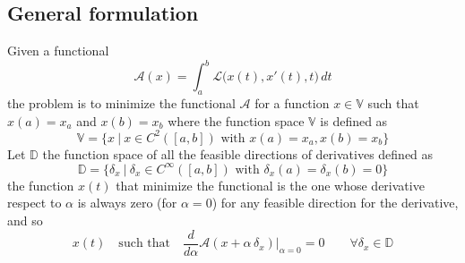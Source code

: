 \subsection{General formulation}
	Given a functional
	\begin{equation}
		\mathcal A(x) = \int_a^b \mathcal L\big(x(t),x'(t),t\big)\, dt
	\end{equation}
	the problem is to minimize the functional $\mathcal A$ for a function $x \in \mathds V$ such that $x(a) = x_a$ and $x(b) = x_b$ where the function space $\mathds V$ is defined as
	\[ \mathds V = \big\{ x \ | \ x\in C^2([a,b]) \textrm{ with } x(a) = x_a,x(b) = x_b \big\} \]
	Let $\mathds D$ the function space of all the feasible directions of derivatives defined as
	\[ \mathds D = \big\{ \delta_x \ | \ \delta_x \in C^{\infty}([a,b]) \textrm{ with } \delta_x(a) = \delta_x(b) = 0 \big\} \]
	the function $x(t)$ that minimize the functional is the one whose derivative respect to $\alpha$ is always zero (for $\alpha = 0$) for any feasible direction for the derivative, and so 
	\[ x(t) \quad\textrm{such that} \quad \frac{d}{d\alpha} \mathcal{A}(x+\alpha\, \delta_x) \Big|_{\alpha = 0} = 0 \qquad \forall \delta_x \in \mathds D \]	
	
